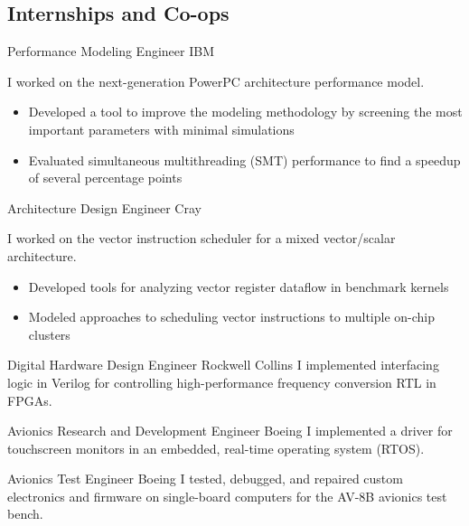 \documentclass[11pt,a4paper,roman]{moderncv}
\begin{document}
\newpage

\subsection{Internships and Co-ops}

\professionentry%
{}%
{Performance Modeling Engineer}%
{IBM}%
{\austin}%
{}%
{I worked on the next-generation PowerPC architecture performance model.
\begin{itemize}[leftmargin=2em,nosep]
\item Developed a tool to improve the modeling methodology by screening the most important parameters with minimal simulations
\item Evaluated simultaneous multithreading (SMT) performance to find a speedup of several percentage points
\end{itemize}}

\professionentry%
{}%
{Architecture Design Engineer}%
{Cray}%
{\chippewafalls}%
{}%
{I worked on the vector instruction scheduler for a mixed vector/scalar architecture.
\begin{itemize}[leftmargin=2em,nosep]
\item Developed tools for analyzing vector register dataflow in benchmark kernels
\item Modeled approaches to scheduling vector instructions to multiple on-chip clusters
\end{itemize}}

\professionentry%
{}%
{Digital Hardware Design Engineer}%
{Rockwell Collins}%
{\whitemarsh}%
{}%
{I implemented interfacing logic in Verilog for controlling high-performance frequency conversion RTL in FPGAs.}

\professionentry%
{}%
{Avionics Research and Development Engineer}%
{Boeing}%
{\stlouis}%
{}%
{I implemented a driver for touchscreen monitors in an embedded, real-time operating system (RTOS).}

\professionentry%
{}%
{Avionics Test Engineer}%
{Boeing}%
{\stlouis}%
{}%
{I tested, debugged, and repaired custom electronics and firmware on single-board computers for the AV-8B avionics test bench.}
\end{document}
